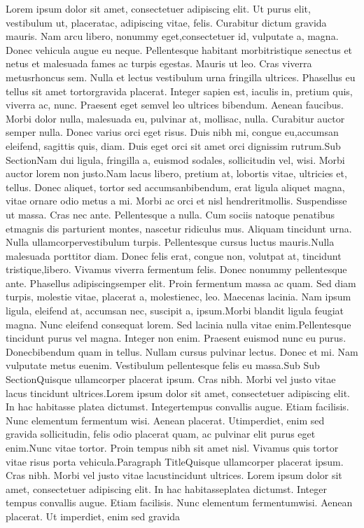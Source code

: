 Lorem ipsum dolor sit amet, consectetuer adipiscing elit. Ut purus elit, vestibulum ut, placeratac, adipiscing vitae, felis. Curabitur dictum gravida mauris. Nam arcu libero, nonummy eget,consectetuer id, vulputate a, magna. Donec vehicula augue eu neque. Pellentesque habitant morbitristique senectus et netus et malesuada fames ac turpis egestas. Mauris ut leo. Cras viverra metusrhoncus sem. Nulla et lectus vestibulum urna fringilla ultrices. Phasellus eu tellus sit amet tortorgravida placerat. Integer sapien est, iaculis in, pretium quis, viverra ac, nunc. Praesent eget semvel leo ultrices bibendum. Aenean faucibus. Morbi dolor nulla, malesuada eu, pulvinar at, mollisac, nulla. Curabitur auctor semper nulla. Donec varius orci eget risus. Duis nibh mi, congue eu,accumsan eleifend, sagittis quis, diam. Duis eget orci sit amet orci dignissim rutrum.Sub SectionNam dui ligula, fringilla a, euismod sodales, sollicitudin vel, wisi. Morbi auctor lorem non justo.Nam lacus libero, pretium at, lobortis vitae, ultricies et, tellus. Donec aliquet, tortor sed accumsanbibendum, erat ligula aliquet magna, vitae ornare odio metus a mi. Morbi ac orci et nisl hendreritmollis. Suspendisse ut massa. Cras nec ante. Pellentesque a nulla. Cum sociis natoque penatibus etmagnis dis parturient montes, nascetur ridiculus mus. Aliquam tincidunt urna. Nulla ullamcorpervestibulum turpis. Pellentesque cursus luctus mauris.Nulla malesuada porttitor diam. Donec felis erat, congue non, volutpat at, tincidunt tristique,libero. Vivamus viverra fermentum felis. Donec nonummy pellentesque ante. Phasellus adipiscingsemper elit. Proin fermentum massa ac quam. Sed diam turpis, molestie vitae, placerat a, molestienec, leo.  Maecenas lacinia.  Nam ipsum ligula, eleifend at, accumsan nec, suscipit a, ipsum.Morbi blandit ligula feugiat magna. Nunc eleifend consequat lorem. Sed lacinia nulla vitae enim.Pellentesque tincidunt purus vel magna. Integer non enim. Praesent euismod nunc eu purus. Donecbibendum quam in tellus. Nullam cursus pulvinar lectus. Donec et mi. Nam vulputate metus euenim. Vestibulum pellentesque felis eu massa.Sub Sub SectionQuisque ullamcorper placerat ipsum. Cras nibh. Morbi vel justo vitae lacus tincidunt ultrices.Lorem ipsum dolor sit amet, consectetuer adipiscing elit. In hac habitasse platea dictumst. Integertempus convallis augue. Etiam facilisis. Nunc elementum fermentum wisi. Aenean placerat. Utimperdiet, enim sed gravida sollicitudin, felis odio placerat quam, ac pulvinar elit purus eget enim.Nunc vitae tortor. Proin tempus nibh sit amet nisl. Vivamus quis tortor vitae risus porta vehicula.Paragraph TitleQuisque ullamcorper placerat ipsum. Cras nibh. Morbi vel justo vitae lacustincidunt ultrices.  Lorem ipsum dolor sit amet, consectetuer adipiscing elit.  In hac habitasseplatea dictumst. Integer tempus convallis augue. Etiam facilisis. Nunc elementum fermentumwisi. Aenean placerat. Ut imperdiet, enim sed gravida
